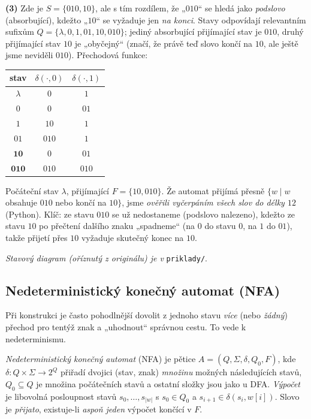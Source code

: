 \documentclass[11pt,a4paper]{article}
\begin{document}
\begin{priklad}
\textbf{(3)} Zde je $S=\{010,10\}$, ale s tím rozdílem, že „$010$`` se hledá jako \emph{podslovo} (absorbující), kdežto „$10$`` se vyžaduje jen \emph{na konci}. Stavy odpovídají relevantním sufixům $Q=\{\lambda,0,1,01,10,010\}$; jediný absorbující přijímající stav je $010$, druhý přijímající stav $10$ je „obyčejný`` (značí, že právě teď slovo končí na $10$, ale ještě jsme neviděli $010$). Přechodová funkce:
\begin{center}\small
\begin{tabular}{c|cc}
\toprule
stav & $\delta(\cdot,0)$ & $\delta(\cdot,1)$\\
\midrule
$\lambda$ & $0$ & $1$\\
$0$ & $0$ & $01$\\
$1$ & $10$ & $1$\\
$01$ & $010$ & $1$\\
$\mathbf{10}$ & $0$ & $01$\\
$\mathbf{010}$ & $010$ & $010$\\
\bottomrule
\end{tabular}
\end{center}
Počáteční stav $\lambda$, přijímající $F=\{10,010\}$. Že automat přijímá přesně $\{w\mid w$ obsahuje $010$ nebo končí na $10\}$, jsme \emph{ověřili vyčerpáním všech slov do délky $12$} (Python). Klíč: ze stavu $010$ se už nedostaneme (podslovo nalezeno), kdežto ze stavu $10$ po přečtení dalšího znaku „spadneme`` (na $0$ do stavu $0$, na $1$ do $01$), takže přijetí přes $10$ vyžaduje skutečný konec na $10$.\par
\emph{Stavový diagram (oříznutý z originálu) je v} \texttt{priklady/}.
\end{priklad}

\subsection{Nedeterministický konečný automat (NFA)}

Při konstrukci je často pohodlnější dovolit z jednoho stavu \emph{více} (nebo \emph{žádný}) přechod pro tentýž znak a „uhodnout`` správnou cestu. To vede k nedeterminismu.

\begin{definice}
\emph{Nedeterministický konečný automat} (NFA) je pětice $A=(Q,\Sigma,\delta,Q_0,F)$, kde $\delta\colon Q\times\Sigma\to 2^Q$ přiřadí dvojici (stav, znak) \emph{množinu} možných následujících stavů, $Q_0\subseteq Q$ je množina počátečních stavů a ostatní složky jsou jako u DFA. \emph{Výpočet} je libovolná posloupnost stavů $s_0,\dots,s_{|w|}$ s $s_0\in Q_0$ a $s_{i+1}\in\delta(s_i,w[i])$. Slovo je \emph{přijato}, existuje-li \emph{aspoň jeden} výpočet končící v $F$.
\end{definice}
\end{document}

